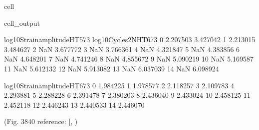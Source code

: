 \documentclass[letterpaper,10pt,english]{jupyterBook}
\begin{document}
\begin{sphinxuseclass}{cell}
\begin{sphinxVerbatimOutput}
\begin{sphinxuseclass}{cell_output}
\begin{sphinxVerbatim}[commandchars=\\\{\}]
					log10Strainamplitude\PYGZus{}H\PYGZus{}T573  log10Cycles2N\PYGZus{}H\PYGZus{}T673  \PYGZbs{}
					0                     \PYGZhy{}2.207503              3.427042   
					1                     \PYGZhy{}2.213015              3.484627   
					2                           NaN              3.677772   
					3                           NaN              3.766361   
					4                           NaN              4.321847   
					5                           NaN              4.383856   
					6                           NaN              4.648201   
					7                           NaN              4.741246   
					8                           NaN              4.855672   
					9                           NaN              5.090219   
					10                          NaN              5.169587   
					11                          NaN              5.612132   
					12                          NaN              5.913082   
					13                          NaN              6.037039   
					14                          NaN              6.098924   
					
					log10Strainamplitude\PYGZus{}H\PYGZus{}T673  
					0                     \PYGZhy{}1.984225  
					1                     \PYGZhy{}1.978577  
					2                     \PYGZhy{}2.118257  
					3                     \PYGZhy{}2.109783  
					4                     \PYGZhy{}2.293881  
					5                     \PYGZhy{}2.288228  
					6                     \PYGZhy{}2.391478  
					7                     \PYGZhy{}2.380203  
					8                     \PYGZhy{}2.436040  
					9                     \PYGZhy{}2.433024  
					10                    \PYGZhy{}2.458125  
					11                    \PYGZhy{}2.452118  
					12                    \PYGZhy{}2.446243  
					13                    \PYGZhy{}2.440533  
					14                    \PYGZhy{}2.446070  
				\end{sphinxVerbatim}
				
				\noindent{}
				
				\noindent{}
				
				\noindent{}
				
		\end{sphinxuseclass}\end{sphinxVerbatimOutput}
		
	\end{sphinxuseclass}
	\sphinxAtStartPar
	(Fig. 38\sphinxhyphen{}40 reference: {[}, \sphinxhref{https://drive.google.com/file/d/1FULDS\_lh6fPXIEWNMebh\_dX1GMocs-6f/view?usp=drive\_link}{Hirose2020}{]})
	
\end{document}
